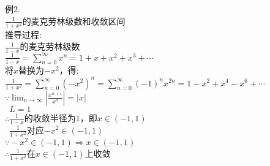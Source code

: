 例2.\\
\quad$\displaystyle\frac{1}{1+x^2}$的麦克劳林级数和收敛区间\\
推导过程:\\
$\displaystyle\frac{1}{1-x}$的麦克劳林级数\\[1ex]
$\displaystyle\frac{1}{1-x}=\sum_{n=0}^{\infty}x^n=1+x+x^2+x^3+\cdots$\\[1ex]
将$x$替换为$-x^2$，得:\\
$\displaystyle\frac{1}{1+x^2}=\sum_{n=0}^{\infty}(-x^2)^n=\sum_{n=0}^{\infty}(-1)^nx^{2n}=1-x^2+x^4-x^6+\cdots$\\
$\because\displaystyle\lim_{n\to\infty}|\frac{x^{n+1}}{x^n}|=|x|$\\
$\phantom{\because}L=1$\\
$\therefore\displaystyle\frac{1}{1-x}$的收敛半径为$1$，即$x\in(-1,1)$\\
$\phantom{\therefore}\displaystyle\frac{1}{1+x^2}$对应$-x^2\in(-1,1)$\\
$\because -x^2\in(-1,1)\Rightarrow x\in(-1,1)$\\
$\therefore\displaystyle\frac{1}{1+x^2}$在$x\in(-1,1)$上收敛
